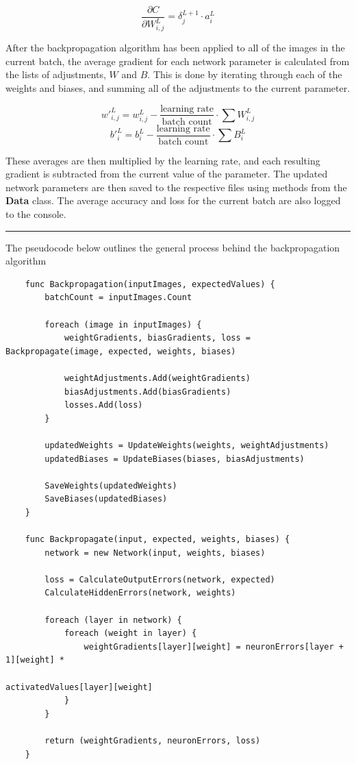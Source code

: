 \documentclass{article}
\begin{document}
\begin{equation*}
    \frac{\partial C}{\partial W_{i, j}^L} = \delta^{L+1}_j\cdot a^L_i 
\end{equation*}

After the backpropagation algorithm has been applied to all of the images in the current batch, the average gradient for each network parameter is calculated from the lists of adjustments, \(W\) and \(B\). This is done by iterating through each of the weights and biases, and summing all of the adjustments to the current parameter.

\begin{equation*}
    w'^L_{i,j}=w^L_{i,j}-\frac{\text{learning rate}}{\text{batch count}}\cdot\sum W^L_{i,j}
\end{equation*}
\begin{equation*}
    b'^L_i=b^L_i-\frac{\text{learning rate}}{\text{batch count}}\cdot\sum B^L_i
\end{equation*}

\vspace{1em}

These averages are then multiplied by the learning rate, and each resulting gradient is subtracted from the current value of the parameter. The updated network parameters are then saved to the respective files using methods from the \textbf{Data} class. The average accuracy and loss for the current batch are also logged to the console.

\begin{center}
\rule{0.5\linewidth}{0.4pt}
\end{center}

\noindent The pseudocode below outlines the general process behind the backpropagation algorithm
\begin{verbatim}
    func Backpropagation(inputImages, expectedValues) {
        batchCount = inputImages.Count

        foreach (image in inputImages) {
            weightGradients, biasGradients, loss = Backpropagate(image, expected, weights, biases)

            weightAdjustments.Add(weightGradients)
            biasAdjustments.Add(biasGradients)
            losses.Add(loss)
        }

        updatedWeights = UpdateWeights(weights, weightAdjustments)
        updatedBiases = UpdateBiases(biases, biasAdjustments)

        SaveWeights(updatedWeights)
        SaveBiases(updatedBiases)
    }

    func Backpropagate(input, expected, weights, biases) {
        network = new Network(input, weights, biases)

        loss = CalculateOutputErrors(network, expected)
        CalculateHiddenErrors(network, weights)

        foreach (layer in network) {
            foreach (weight in layer) {
                weightGradients[layer][weight] = neuronErrors[layer + 1][weight] *
                                                 activatedValues[layer][weight]
            }
        }
        
        return (weightGradients, neuronErrors, loss)
    }
\end{verbatim}
\end{document}
